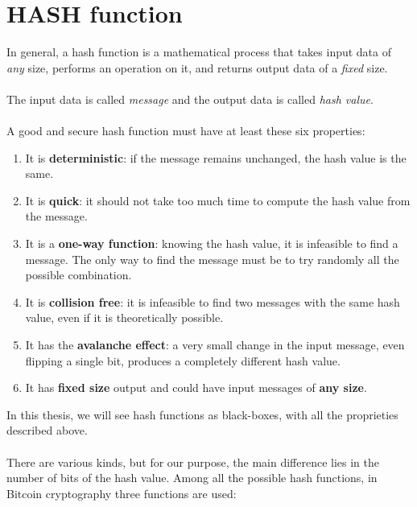 \section{HASH function}
In general, a hash function is a mathematical process that takes input data of \textit{any} size, performs an operation on it, and returns output data of a \textit{fixed} size.
\\ \\
The input data is called \textit{message} and the output data is called \textit{hash value}. 
\\ \\
A good and secure hash function must have at least these six properties:
\begin{enumerate}[label=(\roman*)]
	\item It is \textbf{deterministic}: if the message remains unchanged, the hash value is the same.
	\item It is \textbf{quick}: it should not take too much time to compute the hash value from the message.
	\item It is a \textbf{one-way function}: knowing the hash value, it is infeasible to find a message. The only way to find the message must be to try randomly all the possible combination.
	\item It is \textbf{collision free}: it is infeasible to find two messages with the same hash value, even if it is theoretically possible.
	\item It has the \textbf{avalanche effect}: a very small change in the input message, even flipping a single bit, produces a completely different hash value.
	\item It has \textbf{fixed size} output and could have input messages of \textbf{any size}.
\end{enumerate}
In this thesis, we will see hash functions as black-boxes, with all the proprieties described above. 
\\ \\
There are various kinds, but for our purpose, the main difference lies in the number of bits of the hash value. Among all the possible hash functions, in Bitcoin cryptography three functions are used:
